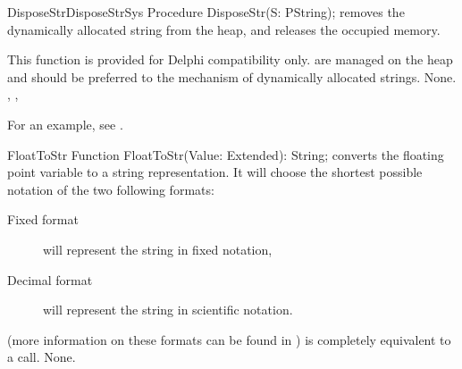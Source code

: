 


 
\begin{procedurel}{DisposeStr}{DisposeStrSys}
\Declaration
Procedure DisposeStr(S: PString);
\Description
{} removes the dynamically allocated string  from the
heap, and releases the occupied memory.

This function is provided for Delphi compatibility only. 
are managed on the heap and should be preferred to the mechanism of
dynamically allocated strings.
\Errors
None.
\SeeAlso
{}, , 
\end{procedurel}

For an example, see .
 
\begin{function}{FloatToStr}
\Declaration
Function FloatToStr(Value: Extended): String;
\Description
{} converts the floating point variable  to a 
string representation.  It will choose the shortest possible notation of the
two following formats:
\begin{description}
\item[Fixed format] will represent the string in fixed notation,
\item[Decimal format] will represent the string in scientific notation.
\end{description}
(more information on these formats can be found in )
 is completely equivalent to a  call.
\Errors
None.
\SeeAlso
{}
\end{function}



